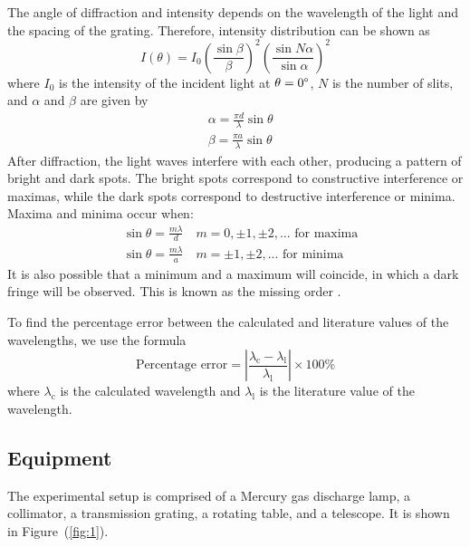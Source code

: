 \documentclass[10pt]{article}
\begin{document}
The angle of diffraction and intensity depends on the wavelength of the light and the spacing of the grating. Therefore, intensity distribution can be shown as
\begin{equation}
  I(\theta) = I_0 \left( \frac{\sin \beta}{\beta} \right)^2 \left( \frac{\sin N \alpha}{\sin \alpha} \right)^2
\end{equation}
where $I_0$ is the intensity of the incident light at $\theta = 0\degree$, $N$ is the number of slits, and $\alpha$ and $\beta$ are given by
\begin{align}
  &\alpha = \frac{\pi d}{\lambda} \sin \theta \\
  &\beta = \frac{\pi a}{\lambda} \sin \theta
\end{align}
After diffraction, the light waves interfere with each other, producing a pattern of bright and dark spots. The bright spots correspond to constructive interference or maximas, while the dark spots correspond to destructive interference or minima. Maxima and minima occur when:
\begin{align}
  &\sin \theta = \frac{m \lambda}{d} \quad m = 0, \pm 1, \pm 2, ... \text{ for maxima} \\
  &\sin \theta = \frac{m \lambda}{a} \quad m = \pm 1, \pm 2, ... \text{ for minima}
\end{align}
It is also possible that a minimum and a maximum will coincide, in which a dark fringe will be observed. This is known as the missing order \cite{Hecht_2017}.

To find the percentage error between the calculated and literature values of the wavelengths, we use the formula
\begin{equation}
  \text{Percentage error} = \left| \frac{\lambda_{\text{c}} - \lambda_{\text{l}}}{\lambda_{\text{l}}} \right| \times 100 \%
  \label{eq:percentage-error}
\end{equation}
where $\lambda_{\text{c}}$ is the calculated wavelength and $\lambda_{\text{l}}$ is the literature value of the wavelength.

\subsection*{Equipment}

The experimental setup is comprised of a Mercury gas discharge lamp, a collimator, a transmission grating, a rotating table, and a telescope. It is shown in Figure~(\ref{fig:1}). 
\end{document}
